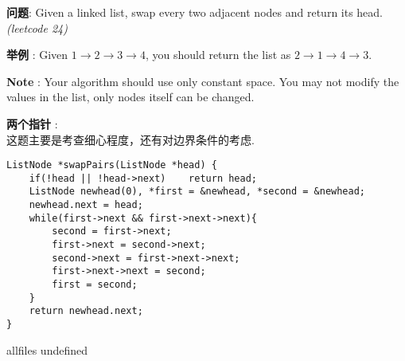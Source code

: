 \documentclass{article}
\begin{document}
\begin{CJK}{UTF8}{gbsn}     %

\else
    
\begin{description}
    \item{\textbf{问题}}: Given a linked list, swap every two adjacent nodes and return its head. \textit{(leetcode 24)}
    \item{\textbf{举例}} : Given $1\rightarrow2\rightarrow3\rightarrow4$, you should return the list as $2\rightarrow1\rightarrow4\rightarrow3$.
    \item{\textbf{Note}} : Your algorithm should use only constant space. You may not modify the values in the list, only nodes itself can be changed.
    \item{\textbf{两个指针}} : 
    \\这题主要是考查细心程度，还有对边界条件的考虑.
    \begin{lstlisting}
ListNode *swapPairs(ListNode *head) {
	if(!head || !head->next)	return head;
	ListNode newhead(0), *first = &newhead, *second = &newhead;
	newhead.next = head;
	while(first->next && first->next->next){
		second = first->next;
		first->next = second->next;
		second->next = first->next->next;
		first->next->next = second;
		first = second;
	}
	return newhead.next;
}
    \end{lstlisting}
\end{description}

\fi

\ifx allfiles undefined
\end{CJK}
\end{document}
